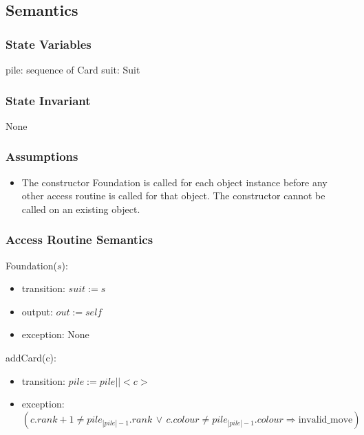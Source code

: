 \documentclass[12pt]{article}
\begin{document}
\subsection* {Semantics}

\subsubsection* {State Variables}

pile: sequence of Card
suit: Suit

\subsubsection* {State Invariant}

None

\subsubsection* {Assumptions}

\begin{itemize}
\item The constructor Foundation is called for each object instance before any other
access routine is called for that object.  The constructor cannot be called on
an existing object.
\end{itemize}

\subsubsection* {Access Routine Semantics}

Foundation($s$):
\begin{itemize}
\item transition: $suit :=  s$
\item output: $out := \mathit{self}$
\item exception: None
\end{itemize}

\noindent addCard(c):
\begin{itemize}
\item transition: $pile := pile || < c > $
\item exception: $(c.rank + 1 \neq pile_{|pile| - 1}.rank \,\lor\, c.colour \neq pile_{|pile| - 1}.colour \Rightarrow \mbox{invalid\_move}) $\\ 
\end{itemize}
\end{document}
